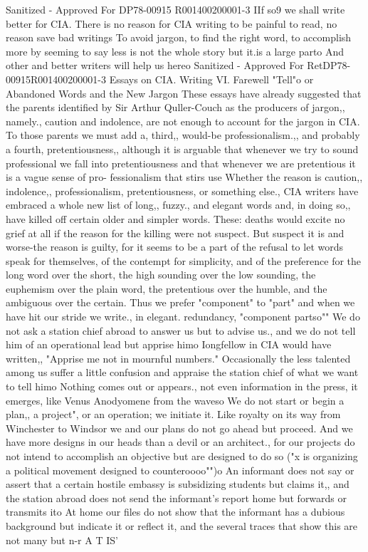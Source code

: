 \documentclass[
    oneside,
    11pt,
    draft
]{memoir}
\begin{document}
Sanitized - Approved For DP78-00915 R001400200001-3 IIf so9 we shall write better for CIA. There is no reason for CIA writing to be painful to read, no reason save bad writings To avoid jargon, to find the right word, to accomplish more by seeming to say less is not the whole story but it.is a large parto And other and better writers will help us hereo
Sanitized - Approved For RetDP78-00915R001400200001-3 Essays on CIA. Writing VI. Farewell "Tell"o or Abandoned Words and the New Jargon These essays have already suggested that the parents identified by Sir Arthur Quller-Couch as the producers of jargon,, namely., caution and indolence, are not enough to account for the jargon in CIA. To those parents we must add a, third,, would-be professionalism.,, and probably a fourth, pretentiousness,, although it is arguable that whenever we try to sound professional we fall into pretentiousness and that whenever we are pretentious it is a vague sense of pro- fessionalism that stirs use Whether the reason is caution,, indolence,, professionalism, pretentiousness, or something else., CIA writers have embraced a whole new list of long,, fuzzy., and elegant words and, in doing so,, have killed off certain older and simpler words. These: deaths would excite no grief at all if the reason for the killing were not suspect. But suspect it is and worse-the reason is guilty, for it seems to be a part of the refusal to let words speak for themselves, of the contempt for simplicity, and of the preference for the long word over the short, the high sounding over the low sounding, the euphemism over the plain word, the pretentious over the humble, and the ambiguous over the certain. Thus we prefer "component" to "part" and when we have hit our stride we write., in elegant. redundancy, "component partso"" We do not ask a station chief abroad to answer us but to advise us., and we do not tell him of an operational lead but apprise himo Iongfellow in CIA would have written,, "Apprise me not in mournful numbers." Occasionally the less talented among us suffer a little confusion and appraise the station chief of what we want to tell himo Nothing comes out or appears., not even information in the press, it emerges, like Venus Anodyomene from the waveso We do not start or begin a plan,, a project", or an operation; we initiate it. Like royalty on its way from Winchester to Windsor we and our plans do not go ahead but proceed. And we have more designs in our heads than a devil or an architect., for our projects do not intend to accomplish an objective but are designed to do so ("x is organizing a political movement designed to counteroooo"")o An informant does not say or assert that a certain hostile embassy is subsidizing students but claims it,, and the station abroad does not send the informant's report home but forwards or transmits ito At home our files do not show that the informant has a dubious background but indicate it or reflect it, and the several traces that show this are not many but n-r A T IS'
\end{document}
